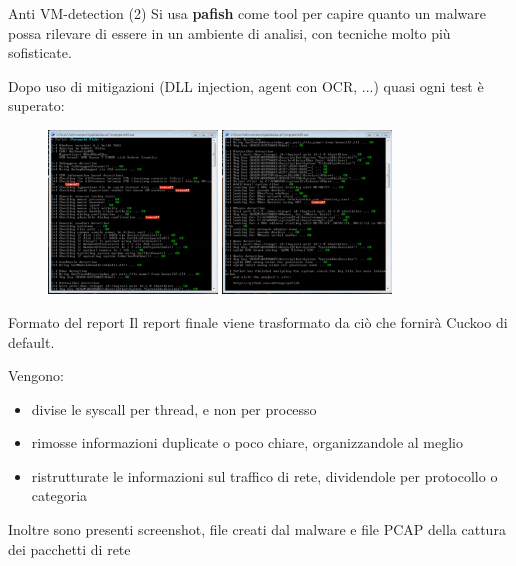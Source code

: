 \begin{frame}{Anti VM-detection (2)}
Si usa \textbf{pafish} come tool per capire quanto un malware possa rilevare di essere in un ambiente di analisi, con tecniche molto più sofisticate.

Dopo uso di mitigazioni (DLL injection, agent con OCR, ...) quasi ogni test è superato:
\begin{figure}
  \centering
  \includegraphics[width=0.4\textwidth]{images/pafish_cuckoo_1.png}
  \includegraphics[width=0.4\textwidth]{images/pafish_cuckoo_2.png}
\end{figure}
\end{frame}

\begin{frame}{Formato del report}
Il report finale viene trasformato da ciò che fornirà Cuckoo di default.

Vengono:
\begin{itemize}
    \item divise le syscall per thread, e non per processo
    \item rimosse informazioni duplicate o poco chiare, organizzandole al meglio
    \item ristrutturate le informazioni sul traffico di rete, dividendole per protocollo o categoria
\end{itemize}
\vfill
Inoltre sono presenti screenshot, file creati dal malware e file PCAP della cattura dei pacchetti di rete
\end{frame}

